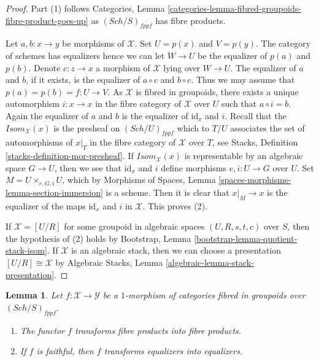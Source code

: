 \documentclass{stacks-project}
\theoremstyle{plain}
\newtheorem{lemma}[subsection]{Lemma}
\theoremstyle{definition}
\theoremstyle{remark}
\numberwithin{equation}{subsection}
\def\Sch{\mathit{Sch}}
\begin{document}
\begin{proof}
Part (1) follows
Categories, Lemma \ref{categories-lemma-fibred-groupoids-fibre-product-goes-up}
as $(\Sch/S)_{fppf}$ has fibre products.

\medskip\noindent
Let $a, b : x \to y$ be morphisms of $\mathcal{X}$.
Set $U = p(x)$ and $V = p(y)$. The category of schemes has equalizers
hence we can let $W \to U$ be the equalizer of $p(a)$ and $p(b)$.
Denote $c : z \to x$ a morphism of $\mathcal{X}$ lying over $W \to U$.
The equalizer of $a$ and $b$, if it exists, is the equalizer of $a \circ c$
and $b \circ c$. Thus we may assume that $p(a) = p(b) = f : U \to V$.
As $\mathcal{X}$ is fibred in groupoids, there exists a unique automorphism
$i : x \to x$ in the fibre category of $\mathcal{X}$ over $U$ such that
$a \circ i = b$. Again the equalizer of $a$ and $b$ is the equalizer
of $\text{id}_x$ and $i$. Recall that the $\mathit{Isom}_\mathcal{X}(x)$
is the presheaf on $(\Sch/U)_{fppf}$ which to
$T/U$ associates the set of automorphisms of $x|_T$ in the fibre category
of $\mathcal{X}$ over $T$, see
Stacks, Definition \ref{stacks-definition-mor-presheaf}.
If $\mathit{Isom}_\mathcal{X}(x)$ is representable by an algebraic space
$G \to U$, then we see that $\text{id}_x$ and $i$ define morphisms
$e, i : U \to G$ over $U$. Set $M = U \times_{e, G, i} U$, which by
Morphisms of Spaces, Lemma \ref{spaces-morphisms-lemma-section-immersion}
is a scheme. Then it is clear that $x|_M \to x$ is the equalizer of
the maps $\text{id}_x$ and $i$ in $\mathcal{X}$.
This proves (2).

\medskip\noindent
If $\mathcal{X} = [U/R]$ for some groupoid in algebraic spaces
$(U, R, s, t, c)$ over $S$, then the hypothesis of (2) holds by
Bootstrap, Lemma \ref{bootstrap-lemma-quotient-stack-isom}.
If $\mathcal{X}$ is an algebraic stack, then we can choose a
presentation $[U/R] \cong \mathcal{X}$ by
Algebraic Stacks, Lemma \ref{algebraic-lemma-stack-presentation}.
\end{proof}

\begin{lemma}
\label{lemma-fibre-products-morphism}
Let $f : \mathcal{X} \to \mathcal{Y}$ be a $1$-morphism of categories
fibred in groupoids over $(\Sch/S)_{fppf}$.
\begin{enumerate}
\item The functor $f$ transforms fibre products into fibre products.
\item If $f$ is faithful, then $f$ transforms equalizers into equalizers.
\end{enumerate}
\end{lemma}
\end{document}
